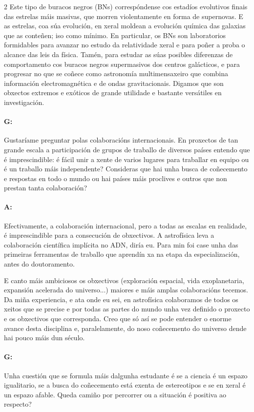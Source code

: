 \begin{refsection}
\begin{multicols}{2}
Este tipo de buracos negros (BNs) correspóndense cos estadíos evolutivos finais
das estrelas máis masivas, que morren violentamente en forma de supernovas. E
as estrelas, coa súa evolución, en xeral moldean a evolución química das
galaxias que as conteñen; iso como mínimo. En particular, os BNs son
laboratorios formidables para avanzar no estudo da relatividade xeral e para
poñer a proba o alcance das leis da física. Tamén, para estudar as súas
posibles diferenzas de comportamento cos buracos negros supermasivos dos
centros galácticos, e para progresar no que se coñece como astronomía
multimensaxeiro que combina información electromagnética e de ondas
gravitacionais. Digamos que son obxectos extremos e exóticos de grande
utilidade e bastante versátiles en investigación.

\paragraph{G:} Gustaríame preguntar polas colaboracións internacionais. En
proxectos de tan grande escala a participación de grupos de traballo de
diversos países entendo que é imprescindible: é fácil unir a xente de varios
lugares para traballar en equipo ou é un traballo máis independente? Consideras
que hai unha busca de coñecemento e respostas en todo o mundo ou hai países
máis proclives e outros que non prestan tanta colaboración?

\paragraph{A:} Efectivamente, a colaboración internacional, pero a todas as
escalas en realidade, é imprescindible para a consecución de obxectivos. A
astrofísica leva a colaboración científica implícita no ADN, diría eu. Para min
foi case unha das primeiras ferramentas de traballo que aprendín xa na etapa da
especialización, antes do doutoramento.

E canto máis ambiciosos os obxectivos (exploración espacial, vida
exoplanetaria, expansión acelerada do universo...) maiores e máis amplas
colaboracións tecemos. Da miña experiencia, e ata onde eu sei, en
astrofísica colaboramos de todos os xeitos que se precise e por todas as partes
do mundo unha vez definido o proxecto e os obxectivos que corresponda. Creo
que só así se pode entender o enorme avance desta disciplina e, paralelamente,
do noso coñecemento do universo dende hai pouco máis dun século.

\paragraph{G:} Unha cuestión que se formula máis dalgunha estudante é se a
ciencia é un espazo igualitario, se a busca do coñecemento está exenta de
estereotipos e se en xeral é un espazo afable. Queda camiño por percorrer ou a
situación é positiva ao respecto?


\end{multicols}
\end{refsection}
